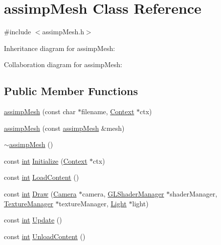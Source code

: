 \hypertarget{classassimp_mesh}{\section{assimp\-Mesh Class Reference}
\label{classassimp_mesh}
}


{\ttfamily \#include $<$assimp\-Mesh.\-h$>$}



Inheritance diagram for assimp\-Mesh\-:


Collaboration diagram for assimp\-Mesh\-:
\subsection*{Public Member Functions}
\begin{DoxyCompactItemize}
\item 
\hyperlink{classassimp_mesh_a85f493d33637bd9801bd8a0945ac1ea7}{assimp\-Mesh} (const char $\ast$filename, \hyperlink{class_context}{Context} $\ast$ctx)
\item 
\hyperlink{classassimp_mesh_a857338e51304936c3cc9cd51562ce22e}{assimp\-Mesh} (const \hyperlink{classassimp_mesh}{assimp\-Mesh} \&mesh)
\item 
\hyperlink{classassimp_mesh_a572b0209390f0afa8a8441b9b267ac9d}{$\sim$assimp\-Mesh} ()
\item 
const \hyperlink{_s_d_l__thread_8h_a6a64f9be4433e4de6e2f2f548cf3c08e}{int} \hyperlink{classassimp_mesh_a4e8fdf121ad27687430cb46fb3d4adee}{Initialize} (\hyperlink{class_context}{Context} $\ast$ctx)
\item 
const \hyperlink{_s_d_l__thread_8h_a6a64f9be4433e4de6e2f2f548cf3c08e}{int} \hyperlink{classassimp_mesh_a24631cc83038c0b1b68959f76f367d49}{Load\-Content} ()
\item 
const \hyperlink{_s_d_l__thread_8h_a6a64f9be4433e4de6e2f2f548cf3c08e}{int} \hyperlink{classassimp_mesh_a27c59be8d8f40e4363c8d2338b8a1fd1}{Draw} (\hyperlink{class_camera}{Camera} $\ast$camera, \hyperlink{class_g_l_shader_manager}{G\-L\-Shader\-Manager} $\ast$shader\-Manager, \hyperlink{class_texture_manager}{Texture\-Manager} $\ast$texture\-Manager, \hyperlink{class_light}{Light} $\ast$light)
\item 
const \hyperlink{_s_d_l__thread_8h_a6a64f9be4433e4de6e2f2f548cf3c08e}{int} \hyperlink{classassimp_mesh_a59eac83134c165e131b4a2f8d6b67410}{Update} ()
\item 
const \hyperlink{_s_d_l__thread_8h_a6a64f9be4433e4de6e2f2f548cf3c08e}{int} \hyperlink{classassimp_mesh_a84833758a86565f8a70802074e4c86b7}{Unload\-Content} ()

\end{DoxyCompactItemize}
